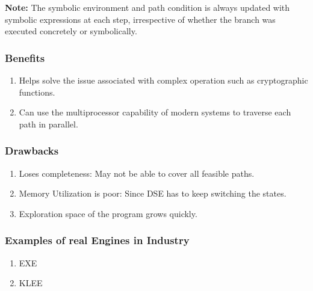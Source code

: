 \documentclass[11pt]{llncs}
\begin{document}
\begin{enumerate}
				\textbf{Note:} The symbolic environment and path condition is always updated with symbolic expressions at each step, irrespective of whether the branch was executed concretely or symbolically.

				\vspace{-2mm}

				\subsubsection{Benefits}
					\vspace{1mm}
					\begin{enumerate}
						\item Helps solve the issue associated with complex operation such as cryptographic functions.
						\item Can use the multiprocessor capability of modern systems to traverse each path in parallel.

					\end{enumerate}

				\vspace{-3mm}
					
				\subsubsection{Drawbacks}
					\vspace{1mm}
					\begin{enumerate}
						\item Loses completeness: May not be able to cover all feasible paths.
						\item Memory Utilization is poor:  Since DSE has to keep switching the states. \cite{1_Search_Strategies_DSE}
						\item Exploration space of the program grows quickly. \cite{2_Survey_SE}
					\end{enumerate}

				\vspace{-3mm}

				\subsubsection{Examples of real Engines in Industry}
					\vspace{1mm}
					\begin{enumerate}
						\item EXE \cite{10_EXE}
						\item KLEE \cite{11_KLEE}
					\end{enumerate}
				

\end{enumerate}
\end{document}
